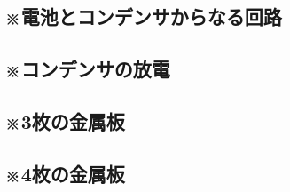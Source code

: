 \documentclass[../../uem_phy_std_q.tex]{subfiles}
\begin{document}
    \subsection{※電池とコンデンサからなる回路}
        
        \vspace{20pt}
        \vfill
    \subsection{※コンデンサの放電}
        
        \vspace{20pt}
        \vfill
    \subsection{※3枚の金属板}
        
        \vspace{20pt}
        \vfill
    \subsection{※4枚の金属板}
        
        \vspace{20pt}
        \vfill
\end{document}
